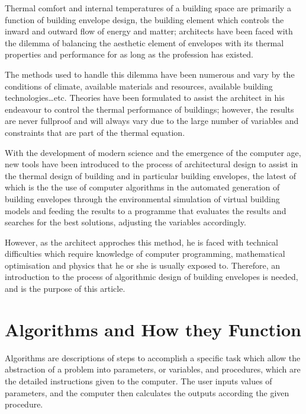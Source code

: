 \documentclass[11pt,a4paper,oneside]{article}
\begin{document}
\begin{multicols}{2}

 Thermal comfort and internal temperatures of a building space are primarily a function of building envelope design, the building element which controls the inward and outward flow of energy and matter; architects have been faced with the dilemma of balancing the aesthetic element of envelopes with its thermal properties and performance for as long as the profession has existed.

The methods used to handle this dilemma have been numerous and vary by the conditions of climate, available materials and resources, available building technologies\ldots{}etc. Theories have been formulated to assist the architect in his endeavour to control the thermal performance of buildings; however, the results are never fullproof and will always vary due to the large number of variables and constraints that are part of the thermal equation.

With the development of modern science and the emergence of the computer age, new tools have been introduced to the process of architectural design to assist in the thermal design of building and in particular building envelopes, the latest of which is the the use of computer algorithms in the automated generation of building envelopes through the environmental simulation of virtual building models and feeding the results to a programme that evaluates the results and searches for the best solutions, adjusting the variables accordingly.

However, as the architect approches this method, he is faced with technical difficulties which require knowledge of computer programming, mathematical optimisation and physics that he or she is usually exposed to. Therefore, an introduction to the process of algorithmic design of building envelopes is needed, and is the purpose of this article.

\section{Algorithms and How they Function}

Algorithms are descriptions of steps to accomplish a specific task which allow the abstraction of a problem into parameters, or variables, and procedures, which are the detailed instructions given to the computer. The user inputs values of parameters, and the computer then calculates the outputs according the given procedure.



\end{multicols}



\end{document}
